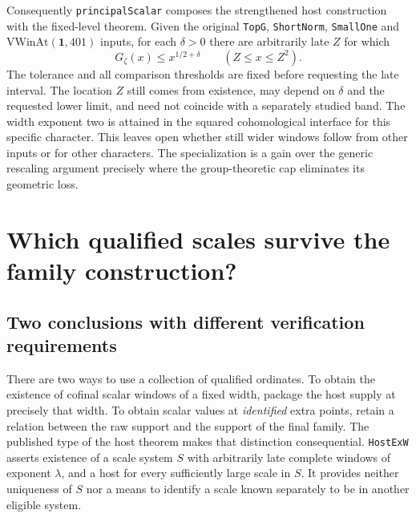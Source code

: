 \documentclass[12pt,letterpaper]{article}
\begin{document}
Consequently \texttt{principalScalar} composes the strengthened host construction with the fixed-level theorem. Given the original \texttt{TopG}, \texttt{ShortNorm}, \texttt{SmallOne} and \(\mathrm{VWinAt}(\mathbf1,401)\) inputs, for each \(\delta>0\) there are arbitrarily late \(Z\) for which
\[
             G_{\zeta}(x)\le x^{1/2+\delta}\qquad (Z\le x\le Z^2).
\]
The tolerance and all comparison thresholds are fixed before requesting the late interval. The location \(Z\) still comes from existence, may depend on \(\delta\) and the requested lower limit, and need not coincide with a separately studied band. The width exponent two is attained in the squared cohomological interface for this specific character. This leaves open whether still wider windows follow from other inputs or for other characters. The specialization is a gain over the generic rescaling argument precisely where the group-theoretic cap eliminates its geometric loss.

\section{Which qualified scales survive the family construction?}
\label{sec:transport-mark}

\subsection{Two conclusions with different verification requirements}

There are two ways to use a collection of qualified ordinates. To obtain the existence of cofinal scalar windows of a fixed width, package the host supply at precisely that width. To obtain scalar values at \emph{identified} extra points, retain a relation between the raw support and the support of the final family. The published type of the host theorem makes that distinction consequential. \texttt{HostExW} asserts existence of a scale system \(S\) with arbitrarily late complete windows of exponent \(\lambda\), and a host for every sufficiently large scale in \(S\). It provides neither uniqueness of \(S\) nor a means to identify a scale known separately to be in another eligible system.
\end{document}
